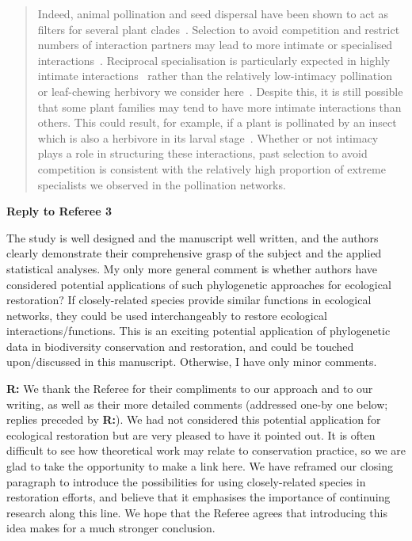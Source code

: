 \documentclass[12pt]{letter}
\newenvironment{refquote}{\bigskip \begin{it}}{\end{it}\smallskip}
\begin{document}
		\begin{quotation}

			Indeed, animal pollination and seed dispersal have been shown to act
			as filters for several plant clades~\citep{Mayfield2009}. Selection to avoid 
			competition and restrict numbers of interaction partners may lead to
			more intimate or specialised interactions~\citep{Ponisio2017}. 
			Reciprocal specialisation is particularly expected in highly intimate interactions~\citep{Hembry2018} rather than the relatively low-intimacy pollination or leaf-chewing herbivory we consider here~\citep{Astegiano2017}.
			Despite this, it is still possible that some plant families may tend to have more intimate interactions than others. This could result, for example, if a plant is pollinated by an insect which is also a herbivore in its larval stage~\citep{Hembry2018}. 
			Whether or not intimacy plays a role in structuring these interactions, past selection to avoid competition is 
			consistent with the relatively high proportion of extreme specialists we
			observed in the pollination networks.

		\end{quotation}


\clearpage

{\Large \bf Reply to Referee 3} 

	\begin{refquote}
		The study is well designed and the manuscript well written, and the authors clearly demonstrate their comprehensive grasp of the subject and the applied statistical analyses.
		My only more general comment is whether authors have considered potential applications of such phylogenetic approaches for ecological restoration? If closely-related species provide similar functions in ecological networks, they could be used interchangeably to restore ecological interactions/functions. This is an exciting potential application of phylogenetic data in biodiversity conservation and restoration, and could be touched upon/discussed in this manuscript.
		Otherwise, I have only minor comments.
	\end{refquote}

	\textbf{R:} We thank the Referee for their compliments to our approach and to our writing, as well as their more detailed comments (addressed one-by one below; replies preceded by \textbf{R:}). We had not considered this potential application for ecological restoration but are very pleased to have it pointed out. It is often difficult to see how theoretical work may relate to conservation practice, so we are glad to take the opportunity to make a link here. We have reframed our closing paragraph to introduce the possibilities for using closely-related species in restoration efforts, and believe that it emphasises the importance of continuing research along this line. We hope that the Referee agrees that introducing this idea makes for a much stronger conclusion.
\end{document}

